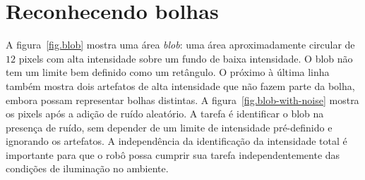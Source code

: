 \section{Reconhecendo bolhas}\label{s.blob}

A figura~\ref{fig.blob} mostra uma área \emph{blob}: uma área aproximadamente circular de $12$ pixels com alta intensidade sobre um fundo de baixa intensidade. O blob não tem um limite bem definido como um retângulo. O próximo à última linha também mostra dois artefatos de alta intensidade que não fazem parte da bolha, embora possam representar bolhas distintas. A figura~\ref{fig.blob-with-noise} mostra os pixels após a adição de ruído aleatório. A tarefa é identificar o blob na presença de ruído, sem depender de um limite de intensidade pré-definido e ignorando os artefatos. A independência da identificação da intensidade total é importante para que o robô possa cumprir sua tarefa independentemente das condições de iluminação no ambiente.

